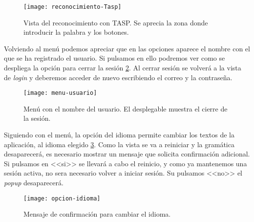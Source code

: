 \begin{figure}[h]
\centering
\texttt{[image: reconocimiento-Tasp]}
\caption{Vista del reconocimiento con TASP. Se aprecia la zona donde introducir la palabra y los botones.}
\label{fig:6.10}
\end{figure}

Volviendo al menú podemos apreciar que en las opciones aparece el nombre con el que se ha registrado el usuario. Si pulsamos en ello podremos ver como se despliega la opción para cerrar la sesión \ref{fig:6.11}. Al cerrar sesión se volverá a la vista de \emph{login} y deberemos acceder de nuevo escribiendo el correo y la contraseña.

\begin{figure}[h]
\centering
\texttt{[image: menu-usuario]}
\caption{Menú con el nombre del usuario. El desplegable muestra el cierre de la sesión.}
\label{fig:6.11}
\end{figure}

Siguiendo con el menú, la opción del idioma permite cambiar los textos de la aplicación, al idioma elegido \ref{fig:6.12}. Como la vista se va a reiniciar y la gramática desaparecerá, es necesario mostrar un mensaje que solicita confirmación adicional. Si pulsamos en <<si>> se llevará a cabo el reinicio, y como ya mantenemos una sesión activa, no sera necesario volver a iniciar sesión. Su pulsamos <<no>> el \emph{popup} desaparecerá.

\begin{figure}[h]
\centering
\texttt{[image: opcion-idioma]}
\caption{Mensaje de confirmación para cambiar el idioma.}
\label{fig:6.12}
\end{figure}

